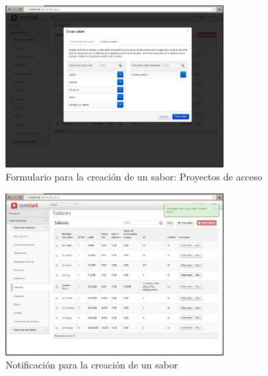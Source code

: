 \documentclass{article}
\begin{document}
\begin{figure}[h]
  \centering
    \includegraphics[width=0.75\textwidth]{img/m_065.png}
  \caption{Formulario para la creación de un sabor: Proyectos de acceso}
  \label{fig:FlavorCreateFormAccess}
\end{figure}	

\begin{figure}[h]
  \centering
    \includegraphics[width=0.75\textwidth]{img/m_066.png}
  \caption{Notificación para la creación de un sabor}
  \label{fig:FlavorCreate}
\end{figure}	
\end{document}
